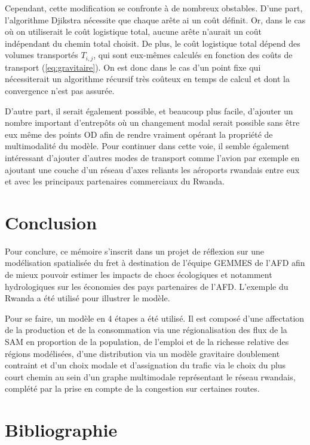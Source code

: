 \documentclass[12pt,a4paper,french]{report}
\begin{document}
	Cependant, cette modification se confronte à de nombreux obstables. D'une part, l'algorithme Djikstra nécessite que chaque arête ai un coût définit. Or, dans le cas où on utiliserait le coût logistique total, aucune arête n'aurait un coût indépendant du chemin total choisit. De plus, le coût logistique total dépend des volumes transportés $T_{i,j}$, qui sont eux-mêmes calculés en fonction des coûts de transport (\ref{eq:gravitaire}). On est donc dans le cas d'un point fixe qui nécessiterait un algorithme récursif très coûteux en temps de calcul et dont la convergence n'est pas assurée.
	
	\medskip
	
	D'autre part, il serait également possible, et beaucoup plus facile, d'ajouter un nombre important d'entrepôts où un changement modal serait possible sans être eux même des points OD afin de rendre vraiment opérant la propriété de multimodalité du modèle. Pour continuer dans cette voie, il semble également intéressant d'ajouter d'autres modes de transport comme l'avion par exemple en ajoutant une couche d'un réseau d'axes reliants les aéroports rwandais entre eux et avec les principaux partenaires commerciaux du Rwanda.
	
	\newpage
	
	\chapter{Conclusion}

Pour conclure, ce mémoire s'inscrit dans un projet de réflexion sur une modélisation spatialisée du fret à destination de l'équipe GEMMES de l'AFD afin de mieux pouvoir estimer les impacts de chocs écologiques et notamment hydrologiques sur les économies des pays partenaires de l'AFD. L'exemple du Rwanda a été utilisé pour illustrer le modèle.

 Pour se faire, un modèle en 4 étapes a été utilisé. Il est composé d'une affectation de la production et de la consommation via une régionalisation des flux de la SAM en proportion de la population, de l'emploi et de la richesse relative des régions modélisées, d'une distribution via un modèle gravitaire doublement contraint et d'un choix modale et d'assignation du trafic via le choix du plus court chemin au sein d'un graphe multimodale représentant le réseau rwandais, complété par la prise en compte de la congestion sur certaines routes.

	\newpage
	
	\chapter*{Bibliographie}
	
\end{document}
